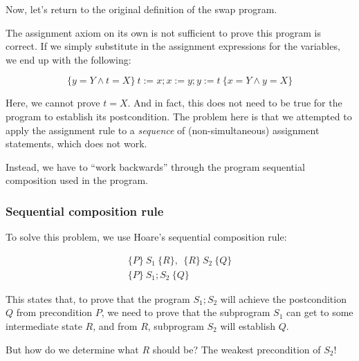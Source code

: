 Now, let's return to the original definition of the swap program.

The assignment axiom on its own is not sufficient to prove this program is correct. If we simply substitute in the assignment expressions for the variables, we end up with the following:

\begin{displaymath}
\{y = Y \land t = X\}~ t := x; x := y; y := t~ \{x = Y \land y = X \}
\end{displaymath}

Here, we cannot prove $t=X$. And in fact, this does not need to be true for the program to establish its postcondition. The problem here is that we attempted to apply the assignment rule to a \emph{sequence} of (non-simultaneous) assignment statements, which does not work.

Instead, we have to ``work backwards'' through the program sequential composition used in the program.

\subsubsection*{Sequential composition rule}

To solve this problem, we use Hoare's sequential composition rule:

\begin{displaymath}
 \begin{array}{c}
  \{P\} ~S_1~ \{R\},~~ \{R\} ~S_2~ \{Q\} \\
 \hline
 \{P\} ~S_1; S_2~ \{Q\}
 \end{array}
\end{displaymath}

This states that, to prove that the program $S_1; S_2$ will achieve the postcondition $Q$ from precondition $P$, we need to prove that the subprogram $S_1$ can get to some intermediate state $R$, and from $R$, subprogram $S_2$ will establish $Q$.

But how do we determine what $R$ should be? The weakest precondition of $S_2$!

